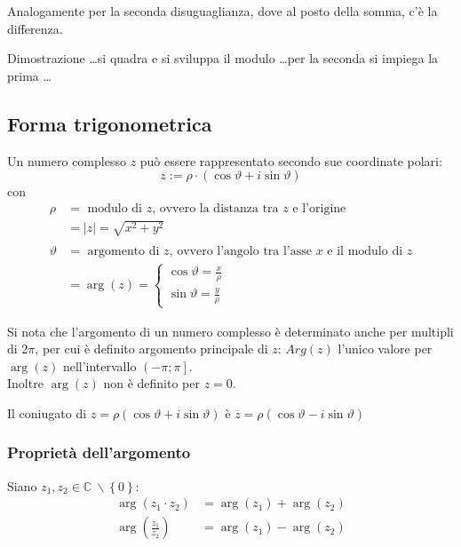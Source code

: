 \documentclass[a4paper]{article}
\begin{document}
Analogamente per la seconda disuguaglianza, dove al posto della somma, c'è la differenza.

Dimostrazione \dots si quadra e si sviluppa il modulo \dots per la seconda si impiega la prima \dots


\subsection{Forma trigonometrica}
Un numero complesso \(z\) può essere rappresentato secondo sue coordinate polari:
\[z := \rho \cdot \left( \cos \vartheta + i \sin \vartheta \right)\]
con
\begin{align*}
	\rho &= \text{ modulo di } z \text{, ovvero la distanza tra } z \text{ e l'origine} \\
	&= \left| z \right| = \sqrt{x^2 + y^2} \\
	\\
	\vartheta &= \text{ argomento di } z \text{, ovvero l'angolo tra l'asse } x \text{ e il modulo di } z\\
	&= \arg(z) = 
	\begin{cases}
		\cos \vartheta = \frac{x}{\rho} \\
		\sin \vartheta = \frac{y}{\rho}
	\end{cases}
\end{align*}

Si nota che l'argomento di un numero complesso è determinato anche per multipli di \(2 \pi\), per cui è definito argomento principale
di \(z\): \(Arg(z)\) l'unico valore per \(\arg(z)\) nell'intervallo \(\left( -\pi; \pi \right]\). \\
Inoltre \(\arg(z)\) non è definito per \(z = 0\).

Il coniugato di \(z = \rho \left( \cos \vartheta + i \sin \vartheta \right)\) è \(\overline{z} = \rho \left( \cos \vartheta - i \sin \vartheta \right)\)


\subsubsection*{Proprietà dell'argomento}
Siano \(z_1, z_2 \in \mathbb{C} \  \backslash \left\{ 0 \right\}\):
\begin{align*}
	\arg \left( z_1 \cdot z_2 \right) &= \arg(z_1) + \arg(z_2) \\
	\arg \left( \frac{z_1}{z_2} \right) &= \arg(z_1) - \arg(z_2)
\end{align*}
\end{document}
